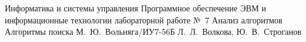 \makereporttitle
    {Информатика и системы управления} %
    {Программное обеспечение ЭВМ и информационные технологии} %
    {лабораторной работе №~7} %
    {Анализ алгоритмов} %
    {Алгоритмы поиска} %
    {} %
    {М.~Ю.~Вольняга/ИУ7-56Б} %
	{Л.~Л.~Волкова, Ю.~В.~Строганов} %